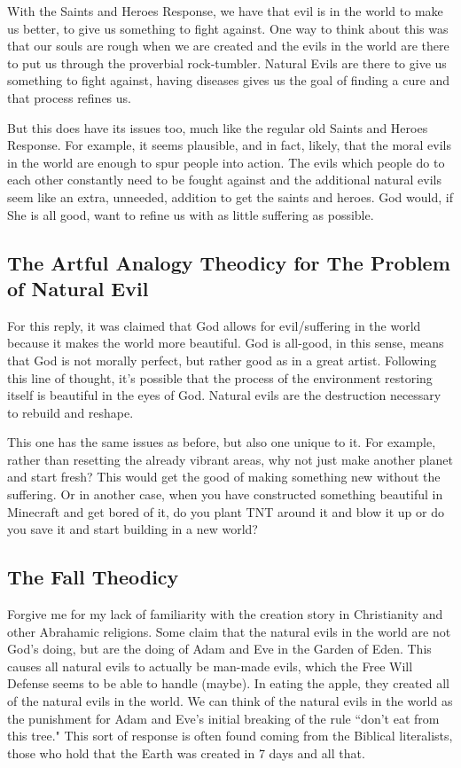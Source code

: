With the Saints and Heroes Response, we have that evil is in the world to make us better, to give us something to fight against. One way to think about this was that our souls are rough when we are created and the evils in the world are there to put us through the proverbial rock-tumbler. Natural Evils are there to give us something to fight against, having diseases gives us the goal of finding a cure and that process refines us. 

But this does have its issues too, much like the regular old Saints and Heroes Response. For example, it seems plausible, and in fact, likely, that the moral evils in the world are enough to spur people into action. The evils which people do to each other constantly need to be fought against and the additional natural evils seem like an extra, unneeded, addition to get the saints and heroes. God would, if She is all good, want to refine us with as little suffering as possible. 

\subsection{The Artful Analogy Theodicy for The Problem of Natural Evil} 

For this reply, it was claimed that God allows for evil/suffering in the world because it makes the world more beautiful. God is all-good, in this sense, means that God is not morally perfect, but rather good as in a great artist. Following this line of thought, it's possible that the process of the environment restoring itself is beautiful in the eyes of God. Natural evils are the destruction necessary to rebuild and reshape.

This one has the same issues as before, but also one unique to it. For example, rather than resetting the already vibrant areas, why not just make another planet and start fresh? This would get the good of making something new without the suffering. Or in another case, when you have constructed something beautiful in Minecraft and get bored of it, do you plant TNT around it and blow it up or do you save it and start building in a new world? 

\subsection{The Fall Theodicy}

Forgive me for my lack of familiarity with the creation story in Christianity and other Abrahamic religions. Some claim that the natural evils in the world are not God’s doing, but are the doing of Adam and Eve in the Garden of Eden. This causes all natural evils to actually be man-made evils, which the Free Will Defense seems to be able to handle (maybe). In eating the apple, they created all of the natural evils in the world. We can think of the natural evils in the world as the punishment for Adam and Eve's initial breaking of the rule ``don't eat from this tree." This sort of response is often found coming from the Biblical literalists, those who hold that the Earth was created in 7 days and all that. 

